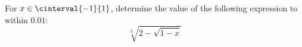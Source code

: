 For $x \in \cinterval{-1}{1}$, determine the value of the following expression to within $0.01$:
\begin{equation*}
  \sqrt[3]{2 - \sqrt{1 - x}}
\end{equation*}
